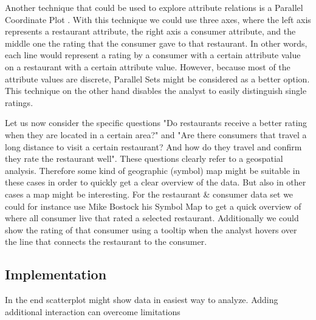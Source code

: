 Another technique that could be used to explore attribute relations is a Parallel Coordinate Plot \cite{D3pcp}. With this technique we could use three axes, where the left axis represents a restaurant attribute, the right axis a consumer attribute, and the middle one the rating that the consumer gave to that restaurant. In other words, each line would represent a rating by a consumer with a certain attribute value on a restaurant with a certain attribute value. However, because most of the attribute values are discrete, Parallel Sets \cite{D3parallelsets} might be considered as a better option. This technique on the other hand disables the analyst to easily distinguish single ratings.

Let us now consider the specific questions "Do restaurants receive a better rating when they are located in a certain area?" and "Are there consumers that travel a long distance to visit a certain restaurant? And how do they travel and confirm they rate the restaurant well". These questions clearly refer to a geospatial analysis. Therefore some kind of geographic (symbol) map \cite{D3map1} might be suitable in these cases in order to quickly get a clear overview of the data. But also in other cases a map might be interesting. For the restaurant \& consumer data set we could for instance use Mike Bostock his Symbol Map to get a quick overview of where all consumer live that rated a selected restaurant. Additionally we could show the rating of that consumer using a tooltip when the analyst hovers over the line that connects the restaurant to the consumer. 

\subsection{Implementation}\label{subsec:implemenation}
In the end scatterplot might show data in easiest way to analyze. Adding additional interaction can overcome limitations





